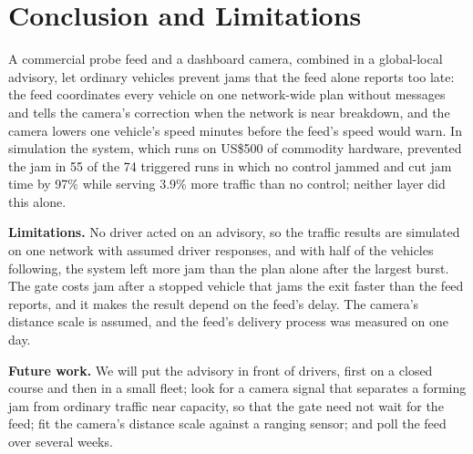 \section{Conclusion and Limitations}
\label{sec:conclusion}

A commercial probe feed and a dashboard camera, combined in a global-local advisory, let ordinary vehicles prevent jams that the feed alone reports too late: the feed coordinates every vehicle on one network-wide plan without messages and tells the camera's correction when the network is near breakdown, and the camera lowers one vehicle's speed minutes before the feed's speed would warn. In simulation the system, which runs on US\$500 of commodity hardware, prevented the jam in 55 of the 74 triggered runs in which no control jammed and cut jam time by 97\% while serving 3.9\% more traffic than no control; neither layer did this alone.

\noindent\textbf{Limitations.} No driver acted on an advisory, so the traffic results are simulated on one network with assumed driver responses, and with half of the vehicles following, the system left more jam than the plan alone after the largest burst. The gate costs jam after a stopped vehicle that jams the exit faster than the feed reports, and it makes the result depend on the feed's delay. The camera's distance scale is assumed, and the feed's delivery process was measured on one day.

\noindent\textbf{Future work.} We will put the advisory in front of drivers, first on a closed course and then in a small fleet; look for a camera signal that separates a forming jam from ordinary traffic near capacity, so that the gate need not wait for the feed; fit the camera's distance scale against a ranging sensor; and poll the feed over several weeks.
